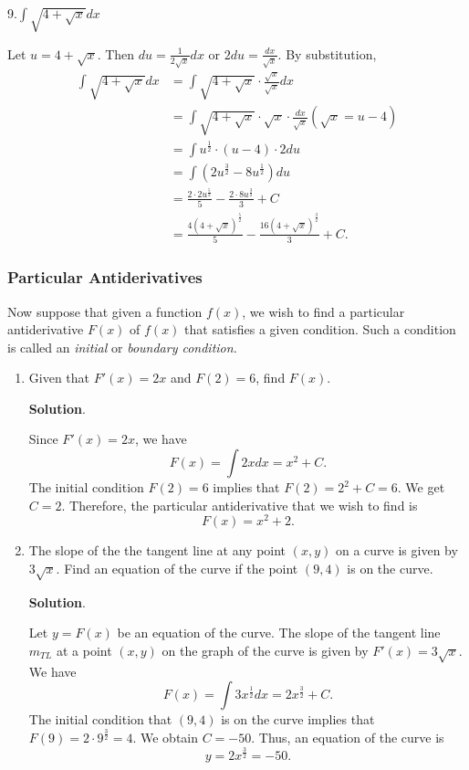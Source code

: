 \documentclass[
  letterpaper,
  DIV=11,
  numbers=noendperiod]{scrartcl}
\begin{document}
9.\(\int \sqrt{4+\sqrt x}dx\)

Let \(u=4+\sqrt x\). Then \(du=\frac{1}{2\sqrt x}dx\) or
\(2du=\frac{dx}{\sqrt x}\). By substitution, \[
\begin{aligned}
\int \sqrt{4+\sqrt x}dx&=\int \sqrt{4+\sqrt x} \cdot\frac{\sqrt x}{\sqrt x}dx\\&=\int \sqrt{4+\sqrt x} \cdot \sqrt x\cdot \frac{dx}{\sqrt x} (\sqrt x=u-4)\\&=\int u^\frac{1}{2}\cdot (u-4)\cdot 2du\\&=\int(2u^\frac{3}{2}-8u^\frac{1}{2}) du\\&=\frac{2\cdot2u^\frac{5}{2}}5-\frac{2\cdot 8u^\frac{3}{2}}{3}+C\\&=\frac{4\left (4+\sqrt x\right)^\frac{5}{2}}{5}-\frac{16\left(4+\sqrt x\right)^\frac{3}{2}}{3}+C.
\end{aligned}
\]

\hypertarget{htm:ParticularAntiderivatives}{}
\hypertarget{particular-antiderivatives}{%
\subsubsection{Particular
Antiderivatives}\label{particular-antiderivatives}}

Now suppose that given a function \(f(x)\), we wish to find a particular
antiderivative \(F(x)\) of \(f(x)\) that satisfies a given condition.
Such a condition is called an \emph{initial} or \emph{boundary
condition.}

\hypertarget{exm:particular_derivatives}{}
\begin{enumerate}
\def\labelenumi{\arabic{enumi}.}
\item
  Given that \(F'(x)=2x\) and \(F(2)=6\), find \(F(x)\).

  \textbf{Solution}.

  Since \(F'(x)=2x\), we have \[
  F(x)=\int 2xdx=x^2+C.
  \]The initial condition \(F(2)=6\) implies that \(F(2)=2^2+C=6\). We
  get \(C=2\). Therefore, the particular antiderivative that we wish to
  find is \[
  F(x)=x^2+2.
  \]
\item
  The slope of the the tangent line at any point \((x,y)\) on a curve is
  given by \(3\sqrt x\). Find an equation of the curve if the point
  \((9,4)\) is on the curve.

  \textbf{Solution}.

  Let \(y=F(x)\) be an equation of the curve. The slope of the tangent
  line \(m_{TL}\) at a point \((x,y)\) on the graph of the curve is
  given by \(F'(x)=3\sqrt x\). We have \[
  F(x)=\int 3x^\frac{1}{2}dx=2x^\frac{3}{2}+C.
  \] The initial condition that \((9,4)\) is on the curve implies that
  \(F(9)=2\cdot 9^\frac{3}{2}=4\). We obtain \(C=-50\). Thus, an
  equation of the curve is \[
  y=2x^\frac{3}{2}=-50.
  \]
\end{enumerate}
\end{document}

